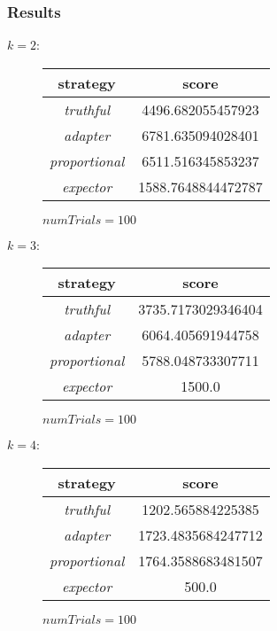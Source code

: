 \documentclass{article}
\newcommand{\expector}{\emph{expector }}
\newcommand{\adapter}{\emph{adapter }}
\newcommand{\truthful}{\emph{truthful }}
\newcommand{\proportional}{\emph{proportional }}
\theoremstyle{remark}
\theoremstyle{remark}
\begin{document}
\subsubsection*{Results}
\textbf{$k = 2 $}:
\begin{figure}[H]
	\centering
	\begin{tabular}{||c c||} 
		\hline
		strategy & score \\ [0.5ex] 
		  \hline
		 \truthful  & 4496.682055457923 \\
		 \hline
		 \adapter  & 6781.635094028401 \\
		 \hline
		 \proportional  & 6511.516345853237 \\
		 \hline
		 \expector  & 1588.7648844472787 \\
		 \hline
	\end{tabular}
	\caption{$ numTrials=100$}
\end{figure}

\pagebreak
\textbf{$k = 3 $}:
\begin{figure}[H]
	\centering
	\begin{tabular}{||c c||} 
		\hline
		strategy & score \\ [0.5ex] 
		  \hline
		 \truthful  & 3735.7173029346404 \\
		 \hline
		 \adapter  & 6064.405691944758 \\
		 \hline
		 \proportional  & 5788.048733307711 \\
		 \hline
		 \expector  & 1500.0 \\
		 \hline
	\end{tabular}
	\caption{$ numTrials=100$}
\end{figure}


\textbf{$k = 4 $}:
\begin{figure}[H]
	\centering
	\begin{tabular}{||c c||} 
		\hline
		strategy & score \\ [0.5ex] 
		 \hline
		 \truthful  & 1202.565884225385 \\
		 \hline
		 \adapter  & 1723.4835684247712 \\
		 \hline
		 \proportional  & 1764.3588683481507 \\
		 \hline
		 \expector  & 500.0 \\
		 \hline
	\end{tabular}
	\caption{$ numTrials=100$}
\end{figure}
\end{document}
